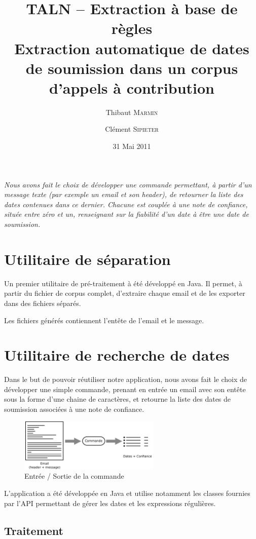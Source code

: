 \documentclass[a4paper,french,10pt]{article}
\title{\textbf{TALN -- Extraction à base de règles\\ \normalsize Extraction automatique de dates de soumission dans un corpus d'appels à contribution}}
\author{Thibaut \textsc{Marmin} \and Clément \textsc{Sipieter}}
\date{31 Mai 2011}
\begin{document}
\maketitle

\emph{Nous avons fait le choix de développer une commande permettant, à partir d'un message texte (par exemple un email et son header), de retourner la liste des dates contenues dans ce dernier. Chacune est couplée à une note de confiance, située entre zéro et un, renseignant sur la fiabilité d'un date à être une date de soumission.}

\section{Utilitaire de séparation}
Un premier utilitaire de pré-traitement à été développé en Java. Il permet, à partir du fichier de corpus complet, d'extraire chaque email et de les exporter dans des fichiers séparés.

Les fichiers générés contiennent l'entête de l'email et le message.

\section{Utilitaire de recherche de dates}
Dans le but de pouvoir réutiliser notre application, nous avons fait le choix de développer une simple commande, prenant en entrée un email avec son entête sous la forme d'une chaine de caractères, et retourne la liste des dates de soumission associées à une note de confiance.

\begin{figure}[H]
\centering
\includegraphics[width=0.6\textwidth]{files/archi}
\caption{Entrée / Sortie de la commande}
\end{figure}

L'application a été développée en Java et utilise notamment les classes fournies par l'API permettant de gérer les dates et les expressions régulières.

\subsection{Traitement}
\end{document}
